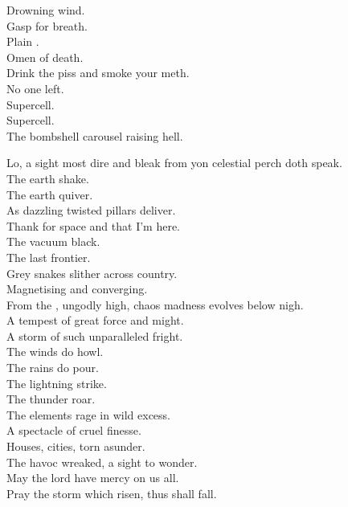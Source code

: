 Drowning wind. \\
Gasp for breath. \\
Plain . \\
Omen of death. \\
Drink the piss and smoke your meth. \\
No one left. \\

Supercell. \\
Supercell. \\
The bombshell carousel raising hell. \\



Lo, a sight most dire and bleak from yon celestial perch doth speak. \\
The earth shake. \\
The earth quiver. \\
As dazzling twisted pillars deliver. \\

Thank  for space and that I'm here. \\
The vacuum black. \\
The last frontier. \\
Grey snakes slither across country. \\
Magnetising and converging. \\

From the , ungodly high, chaos madness evolves below nigh. \\
A tempest of great force and might. \\
A storm of such unparalleled fright. \\
The winds do howl. \\
The rains do pour. \\
The lightning strike. \\
The thunder roar. \\
The elements rage in wild excess. \\
A spectacle of cruel finesse. \\
Houses, cities, torn asunder. \\
The havoc wreaked, a sight to wonder. \\
May the lord have mercy on us all. \\
Pray the storm which risen, thus shall fall. \\

